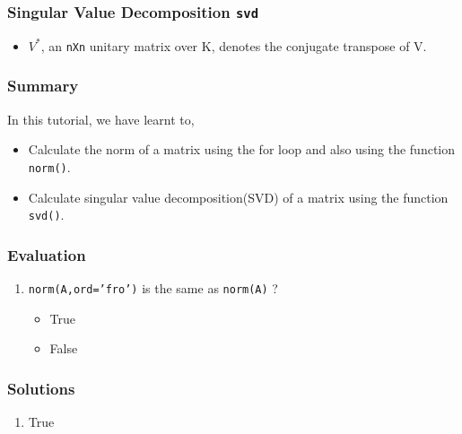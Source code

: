 \documentclass[17pt]{beamer}
\begin{document}
\begin{frame}[fragile]
\frametitle{Singular Value Decomposition \texttt{svd}}
\label{sec-10.2}
 
\begin{itemize}

\item $V^*$,
         an \texttt{nXn} unitary matrix over K, denotes the conjugate transpose of V.
\end{itemize}

\end{frame}
\begin{frame}
\frametitle{Summary}
\label{sec-11.1}

  In this tutorial, we have learnt to, \pause

\begin{itemize}
\item Calculate the norm of a matrix using the for loop and also using the function \texttt{norm()}.\pause
\item Calculate singular value decomposition(SVD) of a matrix using the 
    function \texttt{svd()}.
\end{itemize}
\end{frame}
\begin{frame}
\frametitle{Evaluation}
\label{sec-12.1}

\begin{enumerate}
\item \texttt{norm(A,ord='fro')} is the same as \texttt{norm(A)} ?\pause
\begin{itemize}
\item True
\item False
\end{itemize}
\end{enumerate}
\end{frame}
\begin{frame}
\frametitle{Solutions}
\label{sec-13}


\begin{enumerate}
\item True
\end{enumerate}
\end{frame}
\end{document}
